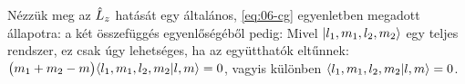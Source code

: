    Nézzük meg az $\hat{L}_z$ hatását egy általános, \eqref{eq:06-cg} egyenletben megadott állapotra:
   a két összefüggés egyenlőségéből pedig:
   Mivel $\lvert l_1,m_1,l_2,m_2\rangle$ egy teljes rendszer, ez csak úgy lehetséges, ha az együtthatók eltűnnek: $\big(m_1+m_2-m\big)\langle l_1,m_1,l_2,m_2\rvert l,m\rangle=0$, vagyis
   különben $\langle l_1,m_1,l_2,m_2\rvert l,m\rangle=0$.
   
